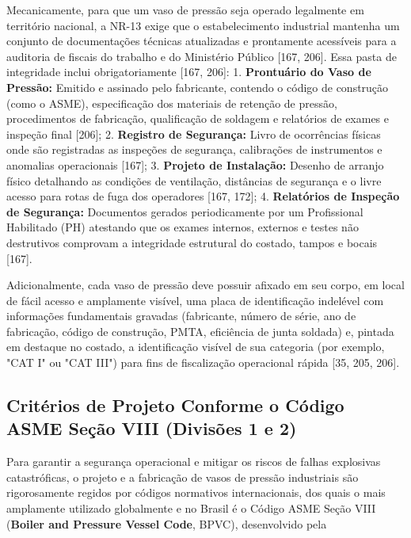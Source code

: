 Mecanicamente, para que um vaso de pressão seja operado legalmente em território nacional, a NR-13 exige que o estabelecimento industrial mantenha um conjunto de documentações técnicas atualizadas e prontamente acessíveis para a auditoria de fiscais do trabalho e do Ministério Público [167, 206]. Essa pasta de integridade inclui obrigatoriamente [167, 206]:
1. \textbf{Prontuário do Vaso de Pressão:} Emitido e assinado pelo fabricante, contendo o código de construção (como o ASME), especificação dos materiais de retenção de pressão, procedimentos de fabricação, qualificação de soldagem e relatórios de exames e inspeção final [206];
2. \textbf{Registro de Segurança:} Livro de ocorrências físicas onde são registradas as inspeções de segurança, calibrações de instrumentos e anomalias operacionais [167];
3. \textbf{Projeto de Instalação:} Desenho de arranjo físico detalhando as condições de ventilação, distâncias de segurança e o livre acesso para rotas de fuga dos operadores [167, 172];
4. \textbf{Relatórios de Inspeção de Segurança:} Documentos gerados periodicamente por um Profissional Habilitado (PH) atestando que os exames internos, externos e testes não destrutivos comprovam a integridade estrutural do costado, tampos e bocais [167].

Adicionalmente, cada vaso de pressão deve possuir afixado em seu corpo, em local de fácil acesso e amplamente visível, uma placa de identificação indelével com informações fundamentais gravadas (fabricante, número de série, ano de fabricação, código de construção, PMTA, eficiência de junta soldada) e, pintada em destaque no costado, a identificação visível de sua categoria (por exemplo, "CAT I" ou "CAT III") para fins de fiscalização operacional rápida [35, 205, 206].


\subsection{Critérios de Projeto Conforme o Código ASME Seção VIII (Divisões 1 e 2)}

Para garantir a segurança operacional e mitigar os riscos de falhas explosivas catastróficas, o projeto e a fabricação de vasos de pressão industriais são rigorosamente regidos por códigos normativos internacionais, dos quais o mais amplamente utilizado globalmente e no Brasil é o Código ASME Seção VIII (\textbf{Boiler and Pressure Vessel Code}, BPVC), desenvolvido pela %

